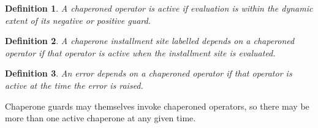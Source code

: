 \documentclass{sigplanconf}
\newtheorem{definition}{Definition}
\begin{document}






\begin{definition}
A chaperoned operator is \emph{active} if evaluation is within the dynamic extent of its negative or positive guard.
\end{definition}

\begin{definition}
A chaperone installment site labelled \emph{depends} on a chaperoned operator if that operator is active when the installment site is evaluated.
\end{definition}



\begin{definition}
An error \emph{depends} on a chaperoned operator if that operator is active at the time the error is raised.
\end{definition}

Chaperone guards may themselves invoke chaperoned operators, so there may be more than one active chaperone at any given time.
\end{document}
